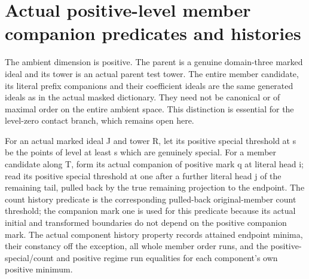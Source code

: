 \section{Actual positive-level member companion predicates and histories}

The ambient dimension is positive. The parent is a genuine domain-three marked
ideal and its tower is an actual parent test tower. The entire member candidate,
its literal prefix companions and their coefficient ideals are the same generated
ideals as in the actual masked dictionary. They need not be canonical or of
maximal order on the entire ambient space. This distinction is essential for
the level-zero contact branch, which remains open here.

\begin{definition}
\label{hir:member-companion-positive-actual-predicates}
\leanok
For an actual marked ideal J and tower R, let its positive special threshold
at s be the points of level at least s which are genuinely special. For a
member candidate along T, form its actual companion of positive mark q at
literal head i; read its positive special threshold at one after a further
literal head j of the remaining tail, pulled back by the true remaining
projection to the endpoint. The count history predicate is the corresponding
pulled-back original-member count threshold; the companion mark one is used
for this predicate because its actual initial and transformed boundaries do
not depend on the positive companion mark. The actual component history property
records attained endpoint minima, their constancy off the exception, all
whole member order runs, and the positive-special/count and positive regime
run equalities for each component's own positive minimum.
\end{definition}

